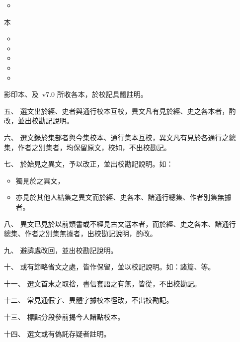 \begin{enumerate}
\begin{itemize}
        \item {}
    \end{itemize}
    本
    \begin{itemize}
        \item {}
        \item {}
        \item {}
        \item {}
        \item {}
    \end{itemize}
    影印本、及\ v7.0 所收各本，於校記具體註明。
    \item[五、] 選文出於經、史者與通行校本互校，異文凡有見於經、史之各本者，酌改，並出校勘記說明。
    \item[六、] 選文錄於集部者與今集校本、通行集本互校，異文凡有見於各通行之總集，作者之別集者，均保留原文，校如，不出校勘記。
    \item[七、] 於始見之異文，予以改正，並出校勘記說明。如：\begin{itemize}
        \item 獨見於之異文，
        \item 亦見於其他人結集之異文而於經、史各本、諸通行總集、作者別集無據者。
    \end{itemize}
    \item[八、] 異文已見於以前類書或不經見古文選本者，而於經、史之各本、諸通行總集、作者之別集無據者，出校勘記說明，酌改。
    \item[九、] 避諱處改回，並出校勘記說明。
    \item[十、] 或有節略省文之處，皆作保留，並以校記說明。如：諸篇、等。
    \item[十一、] 選文首末之取捨，書信套語之有無，皆從，不出校勘記。
    \item[十二、] 常見通假字、異體字據校本徑改，不出校勘記。
    \item[十三、] 標點分段參前揭今人諸點校本。
    \item[十四、] 選文或有偽託存疑者註明。 
\end{enumerate}
  